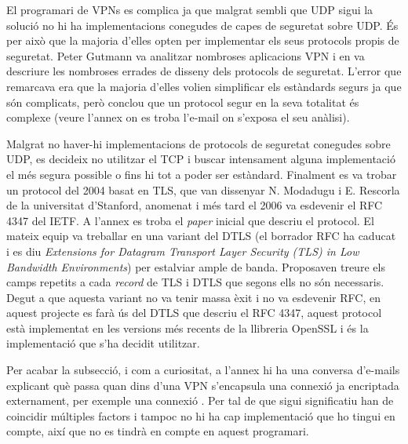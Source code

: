 El programari de VPNs es complica ja que malgrat sembli que UDP sigui la solució no hi ha implementacions conegudes de capes de seguretat sobre UDP. És per això que la majoria d'elles opten per implementar els seus protocols propis de seguretat.
Peter Gutmann va analitzar nombroses aplicacions VPN i en va descriure les nombroses errades de disseny dels protocols de seguretat. L'error que remarcava era que la majoria d'elles volien simplificar els estàndards segurs ja que són complicats, però conclou que un protocol segur en la seva totalitat és complexe (veure l'annex  on es troba l'e-mail on s'exposa el seu anàlisi).

Malgrat no haver-hi implementacions de protocols de seguretat conegudes sobre UDP, es decideix no utilitzar el TCP i buscar intensament alguna implementació el més segura possible o fins hi tot a poder ser estàndard. Finalment es va trobar un protocol del 2004 basat en TLS, que van dissenyar N. Modadugu i E. Rescorla de la universitat d'Stanford, anomenat  i més tard el 2006 va esdevenir el RFC 4347 del IETF. A l'annex  es troba el \emph{paper} inicial que descriu el protocol. El mateix equip va treballar en una variant del DTLS (el borrador RFC ha caducat i es diu \emph{Extensions for Datagram Transport Layer Security (TLS) in Low Bandwidth Environments}) per estalviar ample de banda. Proposaven treure els camps repetits a cada \emph{record} de TLS i DTLS que segons ells no són necessaris. Degut a que aquesta variant no va tenir massa èxit i no va esdevenir RFC, en aquest projecte es farà ús del DTLS que descriu el RFC 4347, aquest protocol està implementat en les versions més recents de la llibreria OpenSSL i és la implementació que s'ha decidit utilitzar.

Per acabar la subsecció, i com a curiositat, a l'annex  hi ha una conversa d'e-mails explicant què passa quan dins d'una VPN s'encapsula una connexió ja encriptada externament, per exemple una connexió . Per tal de que sigui significatiu han de coincidir múltiples factors i tampoc no hi ha cap implementació que ho tingui en compte, així que no es tindrà en compte en aquest programari.

